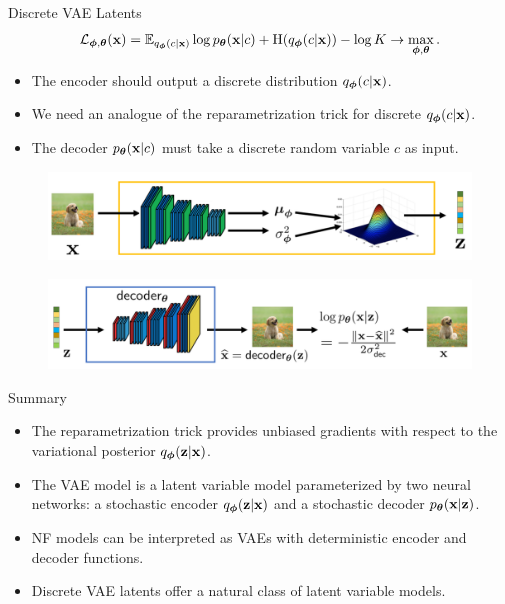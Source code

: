 \documentclass{beamer}
\begin{document}
\begin{frame}{Discrete VAE Latents}
	\[
		\mathcal{L}_{\boldsymbol{\phi}, \boldsymbol{\theta}}(\mathbf{x})  = \mathbb{E}_{q_{\boldsymbol{\phi}}(c| \mathbf{x})} \log p_{\boldsymbol{\theta}}(\mathbf{x}| c) + \mathrm{H}(q_{\boldsymbol{\phi}}(c| \mathbf{x})) - \log K \rightarrow \max_{\boldsymbol{\phi}, \boldsymbol{\theta}}.
	\]
	\eqpause
	\vspace{-0.5cm}
	\begin{itemize}
		\item The encoder should output a discrete distribution $q_{\boldsymbol{\phi}}(c| \mathbf{x})$.
					\item We need an analogue of the reparametrization trick for discrete $q_{\boldsymbol{\phi}}(c| \mathbf{x})$.
		\item The decoder $p_{\boldsymbol{\theta}}(\mathbf{x}| c)$ must take a discrete random variable $c$ as input.
	\end{itemize}
	\begin{figure}[h]
		\centering
		\includegraphics[width=0.7\linewidth]{figs/vae-encoder}
	\end{figure}
	\begin{figure}[h]
		\centering
		\includegraphics[width=0.9\linewidth]{figs/vae-decoder}
	\end{figure}
\end{frame}
\begin{frame}{Summary}
	\begin{itemize}
		\item The reparametrization trick provides unbiased gradients with respect to the variational posterior $q_{\boldsymbol{\phi}}(\mathbf{z}| \mathbf{x})$.
		\vfill
		\item The VAE model is a latent variable model parameterized by two neural networks: a stochastic encoder $q_{\boldsymbol{\phi}}(\mathbf{z}| \mathbf{x})$ and a stochastic decoder $p_{\boldsymbol{\theta}}(\mathbf{x} | \mathbf{z})$.
		\vfill
		\item NF models can be interpreted as VAEs with deterministic encoder and decoder functions.
		\vfill
		\item Discrete VAE latents offer a natural class of latent variable models.
	\end{itemize}
\end{frame}
\end{document}

